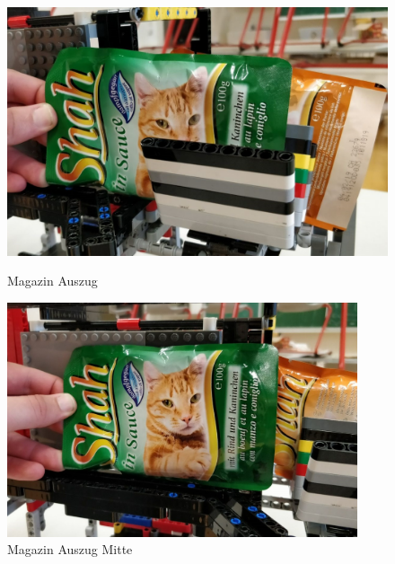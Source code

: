 \begin{figure}[H]
   \begin{minipage}[hbt]{0.5\textwidth} %
      \includegraphics[width=1\textwidth]{Bilder/Ablauf_1_png/Magazin_Auszug}
      \caption{Magazin Auszug}
      \label{Magazin Auszug Start}
   \end{minipage}
   \hspace{.04\linewidth}%
   \begin{minipage}[hbt]{0.5\textwidth} %
      \includegraphics[width=0.92\textwidth]{Bilder/Ablauf_1_png/Magazin_Auszug_2}
      \caption{Magazin Auszug Mitte}
	  \label{Magazin Mitte}      
      \end{minipage}
\end{figure}

\vspace{20pt}

